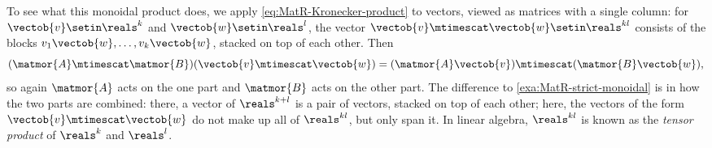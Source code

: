 \begin{example}
    To see what this monoidal product does, we apply \cref{eq:MatR-Kronecker-product} to vectors, viewed as matrices with a single column: for $\vectob{v} \setin \reals^k$ and $\vectob{w} \setin \reals^l$, the vector $\vectob{v} \mtimescat \vectob{w} \setin \reals^{kl}$ consists of the blocks $v_1 \vectob{w}, \ldots, v_k \vectob{w}$, stacked on top of each other.
    Then
    \begin{equation}
        \label{eq:MatR-Kronecker-on-vectors}
        (\matmor{A} \mtimescat \matmor{B})(\vectob{v} \mtimescat \vectob{w}) = (\matmor{A}\vectob{v}) \mtimescat (\matmor{B}\vectob{w}),
    \end{equation}
    so again $\matmor{A}$ acts on the one part and $\matmor{B}$ acts on the other part.
    The difference to \cref{exa:MatR-strict-monoidal} is in how the two parts are combined: there, a vector of $\reals^{k+l}$ is a pair of vectors, stacked on top of each other; here, the vectors of the form $\vectob{v} \mtimescat \vectob{w}$ do not make up all of $\reals^{kl}$, but only span it.
    In linear algebra, $\reals^{kl}$ is known as the \emph{tensor product} of $\reals^k$ and $\reals^l$.


\end{example}
